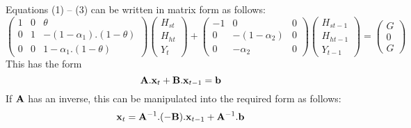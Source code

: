 \documentclass[twoside,a4paper,11pt]{article}
\begin{document}
Equations (1) -- (3) can be written in matrix form as follows:
\begin{equation*}
\begin{pmatrix}
1 & 0 & \theta\\
0 & 1 &  - (1-\alpha_1).(1-\theta)\\
0 & 0 & 1-\alpha_1.(1-\theta)
\end{pmatrix}
\begin{pmatrix}
H_{st}\\
H_{ht}\\
Y_t
\end{pmatrix}
+
\begin{pmatrix}
-1 & 0 & 0\\
0 & - (1-\alpha_2) &  0\\
0 & -\alpha_2 & 0
\end{pmatrix}
\begin{pmatrix}
H_{st-1}\\
H_{ht-1}\\
Y_{t-1}
\end{pmatrix}
=
\begin{pmatrix}
G\\
0\\
G
\end{pmatrix}
\end{equation*}
This has the form
$$\mathbf{A}.\mathbf{x}_t + \mathbf{B}.\mathbf{x}_{t-1} = \mathbf{b}$$
If $\mathbf{A}$ has an inverse, this can be manipulated into the required form as follows:
$$\mathbf{x}_t = \mathbf{A}^{-1}.(-\mathbf{B}).\mathbf{x}_{t-1} + \mathbf{A}^{-1}.\mathbf{b}$$
\end{document}
